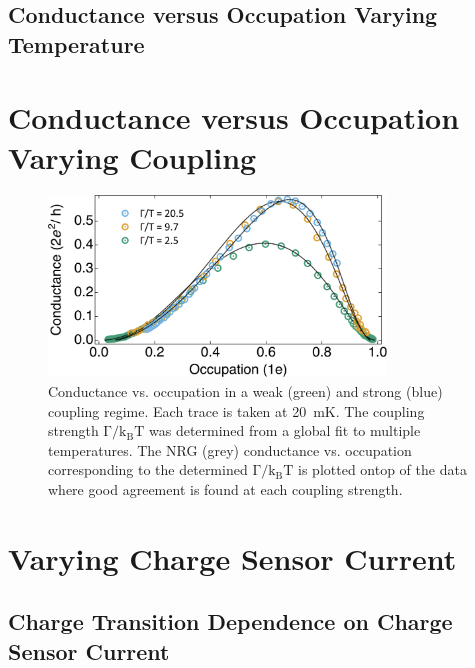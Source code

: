 \subsection{Conductance versus Occupation Varying Temperature}





\section{Conductance versus Occupation Varying Coupling}

\begin{figure}[!bht]
  \begin{center}
    \includegraphics[width=0.8\textwidth]{figures/ch3/crop_FiguresMaster.015.png}
    \caption[Conductance vs. Occupation : Varying the coupling strength between the quantum dot and leads]{\label{fig:ch3/cond_occ_couplingstrength} 
    Conductance vs. occupation in a weak (green) and strong (blue) coupling regime. Each trace is taken at \qty{20}{mK}. The coupling strength $\mathrm{\Gamma/k_BT}$ was determined from a global fit to multiple temperatures. The NRG (grey) conductance vs. occupation corresponding to the determined $\mathrm{\Gamma/k_BT}$ is plotted ontop of the data where good agreement is found at each coupling strength.}
  \end{center}
\end{figure}



\section{Varying Charge Sensor Current}

\subsection{Charge Transition Dependence on Charge Sensor Current}

